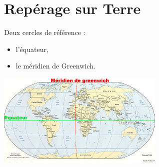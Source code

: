\documentclass[a4paper,11pt]{article}
\begin{document}
\begin{center}
\end{center}
\section{Repérage sur Terre}
Deux cercles de référence :
\begin{itemize}
    \item l’équateur,
    \item le méridien de Greenwich.
\end{itemize}
\begin{center}
    \centering
    \includegraphics[width=8cm]{ressources/greenwich.jpg}
    \label{greenwich}
\end{center}
\end{document}
